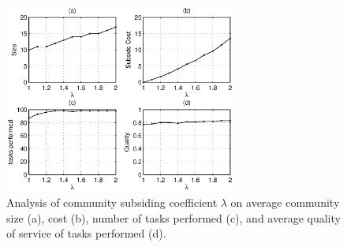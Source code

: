 %
%


\begin{figure}%
\centering
\includegraphics[width=3in]{taxtation.eps}
\caption{Analysis of community subsiding coefficient $\lambda$ on
average community size (a), cost (b), number of tasks performed
(c), and average quality of service of tasks performed (d).}
\label{f_taxtation}
\end{figure}

